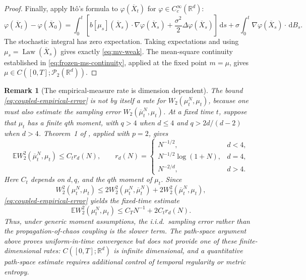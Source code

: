 \documentclass[11pt]{amsart}
\numberwithin{equation}{section}
\theoremstyle{plain}
\newtheorem{remark}[theorem]{Remark}
\newcommand{\R}{\mathbb{R}}
\newcommand{\E}{\mathbb{E}}
\newcommand{\cP}{\mathcal{P}}
\newcommand{\dd}{\,\mathrm{d}}
\DeclareMathOperator{\Law}{Law}
\begin{document}
\begin{proof}
Finally, apply It\^o's formula to $\varphi(\overline X_t)$ for
$\varphi\in C_c^\infty(\R^d)$:
\[
 \varphi(\overline X_t)-\varphi(\overline X_0)
 =\int_0^t\left[
 b[\mu_s](\overline X_s)\cdot\nabla\varphi(\overline X_s)
 +\frac{\sigma^2}{2}\Delta\varphi(\overline X_s)\right]\dd s
 +\sigma\int_0^t\nabla\varphi(\overline X_s)\cdot\dd B_s.
\]
The stochastic integral has zero expectation.  Taking expectations and using
$\mu_s=\Law(\overline X_s)$ gives exactly \eqref{eq:mv-weak}.  The
mean-square continuity established in \eqref{eq:frozen-ms-continuity}, applied
at the fixed point $m=\mu$, gives $\mu\in C([0,T];\cP_2(\R^d))$.
\end{proof}

\begin{remark}[The empirical-measure rate is dimension dependent]
\label{rem:empirical-measure-rate}
The bound \eqref{eq:coupled-empirical-error} is not by itself a rate for
$W_2(\mu_t^N,\mu_t)$, because one must also estimate the sampling error
$W_2(\overline\mu_t^N,\mu_t)$.  At a fixed time $t$, suppose that $\mu_t$ has
a finite $q$th moment, with $q>4$ when $d\leq4$ and
$q>2d/(d-2)$ when $d>4$.  Theorem~1 of
\cite{FournierGuillin2015}, applied with $p=2$, gives
\[
 \E W_2^2(\overline\mu_t^N,\mu_t)\leq C_t r_d(N),
 \qquad
 r_d(N)=
 \begin{cases}
  N^{-1/2},&d<4,\\
  N^{-1/2}\log(1+N),&d=4,\\
  N^{-2/d},&d>4.
 \end{cases}
\]
Here $C_t$ depends on $d,q$, and the $q$th moment of $\mu_t$.  Since
\[
 W_2^2(\mu_t^N,\mu_t)
 \leq2W_2^2(\mu_t^N,\overline\mu_t^N)
     +2W_2^2(\overline\mu_t^N,\mu_t),
\]
\eqref{eq:coupled-empirical-error} yields the fixed-time estimate
\[
 \E W_2^2(\mu_t^N,\mu_t)
 \leq C_TN^{-1}+2C_t r_d(N).
\]
Thus, under generic moment assumptions, the i.i.d.\ sampling error rather
than the propagation-of-chaos coupling is the slower term.  The path-space
argument above proves uniform-in-time convergence but does not provide one of
these finite-dimensional rates: $C([0,T];\R^d)$ is infinite dimensional, and
a quantitative path-space estimate requires additional control of temporal
regularity or metric entropy.
\end{remark}
\end{document}
